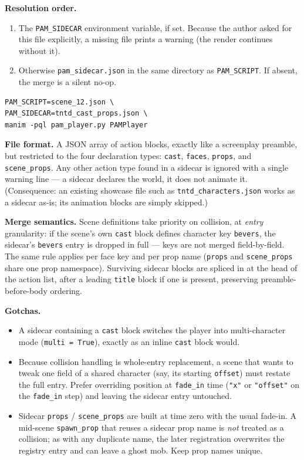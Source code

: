 \documentclass[
  12pt,
  letterpaper,
]{book}
\begin{document}
\textbf{Resolution order.}

\begin{enumerate}
\item
  The \texttt{PAM\_SIDECAR} environment variable, if set. Because the
  author asked for this file explicitly, a missing file prints a
  warning (the render continues without it).
\item
  Otherwise \texttt{pam\_sidecar.json} in the same directory as
  \texttt{PAM\_SCRIPT}. If absent, the merge is a silent no-op.
\end{enumerate}

\begin{verbatim}
PAM_SCRIPT=scene_12.json \
PAM_SIDECAR=tntd_cast_props.json \
manim -pql pam_player.py PAMPlayer
\end{verbatim}

\textbf{File format.} A JSON array of action blocks, exactly like a
screenplay preamble, but restricted to the four declaration types:
\texttt{cast}, \texttt{faces}, \texttt{props}, and
\texttt{scene\_props}. Any other action type found in a sidecar is
ignored with a single warning line --- a sidecar declares the world, it
does not animate it. (Consequence: an existing showcase file such as
\texttt{tntd\_characters.json} works as a sidecar as-is; its
animation blocks are simply skipped.)

\textbf{Merge semantics.} Scene definitions take priority on
collision, at \emph{entry} granularity: if the scene's own
\texttt{cast} block defines character key \texttt{bevers}, the
sidecar's \texttt{bevers} entry is dropped in full --- keys are not
merged field-by-field. The same rule applies per face key and per prop
name (\texttt{props} and \texttt{scene\_props} share one prop
namespace). Surviving sidecar blocks are spliced in at the head of the
action list, after a leading \texttt{title} block if one is present,
preserving preamble-before-body ordering.

\textbf{Gotchas.}

\begin{itemize}
\item
  A sidecar containing a \texttt{cast} block switches the player into
  multi-character mode (\texttt{multi\ =\ True}), exactly as an inline
  \texttt{cast} block would.
\item
  Because collision handling is whole-entry replacement, a scene that
  wants to tweak one field of a shared character (say, its starting
  \texttt{offset}) must restate the full entry. Prefer overriding
  position at \texttt{fade\_in} time (\texttt{"x"} or
  \texttt{"offset"} on the \texttt{fade\_in} step) and leaving the
  sidecar entry untouched.
\item
  Sidecar \texttt{props} / \texttt{scene\_props} are built at time
  zero with the usual fade-in. A mid-scene \texttt{spawn\_prop} that
  reuses a sidecar prop name is \emph{not} treated as a collision; as
  with any duplicate name, the later registration overwrites the
  registry entry and can leave a ghost mob. Keep prop names unique.
\end{itemize}
\end{document}
